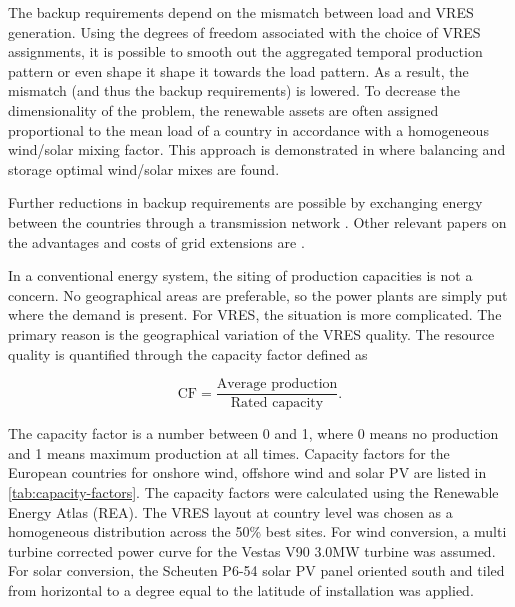 \documentclass[a4paper, 5p, sort&compress]{elsarticle}%
\begin{document}
The backup requirements depend on the mismatch between load and VRES
generation. Using the degrees of freedom associated with the choice of
VRES assignments, it is possible to smooth out the aggregated temporal
production pattern or even shape it shape it towards the load
pattern. As a result, the mismatch (and thus the backup requirements)
is lowered.  To decrease the dimensionality of the problem, the
renewable assets are often assigned proportional to the mean load of a
country in accordance with a homogeneous wind/solar mixing
factor. This approach is demonstrated in
\cite{Heide2010,Heide2011} where balancing and storage optimal
wind/solar mixes are found.

Further reductions in backup requirements are possible by exchanging
energy between the countries through a transmission network
\cite{rolando2014,sarah}. Other relevant papers on the advantages and
costs of grid extensions are \cite{Schaber, Schaber2}.


In a conventional energy system, the siting of production capacities
is not a concern. No geographical areas are preferable, so the power
plants are simply put where the demand is present. For VRES, the
situation is more complicated. The primary reason is the geographical
variation of the VRES
quality. %
The resource quality is quantified through the capacity factor defined as

\begin{equation}
  \label{eq:1}
  \mbox{CF} = \frac{\mbox{Average production}}{\mbox{Rated capacity}} .
\end{equation}

The capacity factor is a number between 0 and 1, where 0 means no
production and 1 means maximum production at all times. Capacity
factors for the European countries for onshore wind, offshore wind and
solar PV are listed in \cref{tab:capacity-factors}. The capacity
factors were calculated using the Renewable Energy Atlas \cite{REA}
(REA). The VRES layout at country level was chosen as a homogeneous
distribution across the 50\% best sites. For wind conversion, a multi
turbine corrected power curve for the Vestas V90 3.0MW turbine was
assumed. For solar conversion, the Scheuten P6-54 solar PV panel
oriented south and tiled from horizontal to a degree equal to the
latitude of installation was applied.
\end{document}
